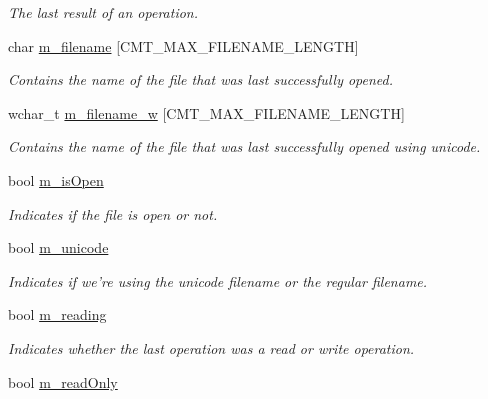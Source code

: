 \begin{DoxyCompactItemize}
\begin{DoxyCompactList}\small\item\em \-The last result of an operation. \end{DoxyCompactList}\item 
\hypertarget{classxsens_1_1Cmt1f_a43ddc4718e69ed4fe21c6574da58f4d2}{char \hyperlink{classxsens_1_1Cmt1f_a43ddc4718e69ed4fe21c6574da58f4d2}{m\-\_\-filename} \mbox{[}\-C\-M\-T\-\_\-\-M\-A\-X\-\_\-\-F\-I\-L\-E\-N\-A\-M\-E\-\_\-\-L\-E\-N\-G\-T\-H\mbox{]}}\label{classxsens_1_1Cmt1f_a43ddc4718e69ed4fe21c6574da58f4d2}

\begin{DoxyCompactList}\small\item\em \-Contains the name of the file that was last successfully opened. \end{DoxyCompactList}\item 
\hypertarget{classxsens_1_1Cmt1f_a794d7d18b2ea76cf8a6455072261f6b9}{wchar\-\_\-t \hyperlink{classxsens_1_1Cmt1f_a794d7d18b2ea76cf8a6455072261f6b9}{m\-\_\-filename\-\_\-w} \mbox{[}\-C\-M\-T\-\_\-\-M\-A\-X\-\_\-\-F\-I\-L\-E\-N\-A\-M\-E\-\_\-\-L\-E\-N\-G\-T\-H\mbox{]}}\label{classxsens_1_1Cmt1f_a794d7d18b2ea76cf8a6455072261f6b9}

\begin{DoxyCompactList}\small\item\em \-Contains the name of the file that was last successfully opened using unicode. \end{DoxyCompactList}\item 
\hypertarget{classxsens_1_1Cmt1f_a5f2130dc8026b6a8ad55ffbdaac74150}{bool \hyperlink{classxsens_1_1Cmt1f_a5f2130dc8026b6a8ad55ffbdaac74150}{m\-\_\-is\-Open}}\label{classxsens_1_1Cmt1f_a5f2130dc8026b6a8ad55ffbdaac74150}

\begin{DoxyCompactList}\small\item\em \-Indicates if the file is open or not. \end{DoxyCompactList}\item 
\hypertarget{classxsens_1_1Cmt1f_a6da996485f79b6aa12b089b31dc4c654}{bool \hyperlink{classxsens_1_1Cmt1f_a6da996485f79b6aa12b089b31dc4c654}{m\-\_\-unicode}}\label{classxsens_1_1Cmt1f_a6da996485f79b6aa12b089b31dc4c654}

\begin{DoxyCompactList}\small\item\em \-Indicates if we're using the unicode filename or the regular filename. \end{DoxyCompactList}\item 
bool \hyperlink{classxsens_1_1Cmt1f_a743b759eb55ae888d44a37c865870bb4}{m\-\_\-reading}
\begin{DoxyCompactList}\small\item\em \-Indicates whether the last operation was a read or write operation. \end{DoxyCompactList}\item 
\hypertarget{classxsens_1_1Cmt1f_ac87b9035d8cbd6d3f7ecff38660a4216}{bool \hyperlink{classxsens_1_1Cmt1f_ac87b9035d8cbd6d3f7ecff38660a4216}{m\-\_\-read\-Only}}\label{classxsens_1_1Cmt1f_ac87b9035d8cbd6d3f7ecff38660a4216}


\end{DoxyCompactItemize}
